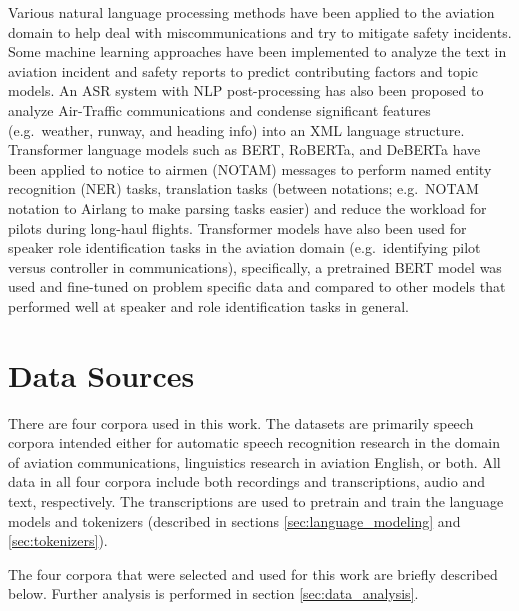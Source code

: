 \documentclass[12pt]{article}
\begin{document}
Various natural language processing methods have been applied to the aviation domain to help deal with miscommunications
and try to mitigate safety incidents\cite{ragnarsdottir_language_2003,tanguy_natural_2016,madeira_machine_2021}.
Some machine learning approaches have been implemented to analyze the text in aviation incident and safety reports to predict
contributing factors and topic models\cite{tanguy_natural_2016,madeira_machine_2021}. An ASR system with NLP post-processing
has also been proposed to analyze Air-Traffic communications and condense significant features (e.g.~weather, runway, and
heading info) into an XML language structure\cite{ragnarsdottir_language_2003}. Transformer language models such as BERT,
RoBERTa, and DeBERTa have been applied to notice to airmen (NOTAM) messages to perform named entity recognition (NER) tasks,
translation tasks (between notations; e.g.~NOTAM notation to Airlang to make parsing tasks easier) and reduce the workload
for pilots during long-haul flights\cite{arnold_knowledge_2022}. Transformer models have also been used for speaker role
identification tasks in the aviation domain (e.g.~identifying pilot versus controller in communications), specifically,
a pretrained BERT model was used and fine-tuned on problem specific data and compared to other models that performed
well at speaker and role identification tasks in general\cite{guo_comparative_2022}.



\section{Data Sources}\label{sec:data_source}
There are four corpora used in this work. The datasets are primarily speech corpora intended either for automatic speech recognition research in the
domain of aviation communications, linguistics research in aviation English, or both. All data in all four corpora include both recordings and
transcriptions, audio and text, respectively. The transcriptions are used to pretrain and train the language models and tokenizers (described in
sections \ref{sec:language_modeling} and \ref{sec:tokenizers}).

The four corpora that were selected and used for this work are briefly described below. Further analysis is performed in section \ref{sec:data_analysis}.
\end{document}
